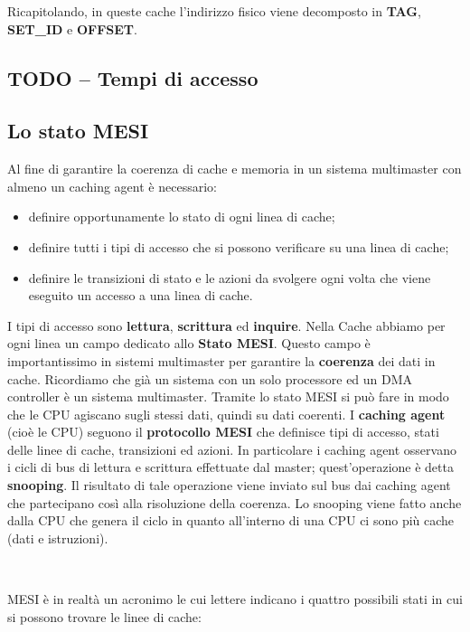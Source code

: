 \documentclass[11pt]{book}
\begin{document}
Ricapitolando, in queste cache l'indirizzo fisico viene decomposto in
\textbf{TAG}, \textbf{SET\_ID} e \textbf{OFFSET}.

\subsection{TODO -- Tempi di accesso}

\subsection{Lo stato MESI}

Al fine di garantire la coerenza di cache e memoria in un sistema
multimaster con almeno un caching agent \`e necessario:

\begin{itemize}
\item definire opportunamente lo stato di ogni linea di cache;
\item definire tutti i tipi di accesso che si possono verificare su
  una linea di cache;
\item definire le transizioni di stato e le azioni da svolgere ogni
  volta che viene eseguito un accesso a una linea di cache.
\end{itemize}

I tipi di accesso sono \textbf{lettura}, \textbf{scrittura} ed
\textbf{inquire}. Nella Cache abbiamo per ogni linea un campo dedicato
allo \textbf{Stato MESI}. Questo campo \`e importantissimo in sistemi
multimaster per garantire la \textbf{coerenza} dei dati in
cache. Ricordiamo che gi\`a un sistema con un solo processore ed un
DMA controller \`e un sistema multimaster. Tramite lo stato MESI si
pu\`o fare in modo che le CPU agiscano sugli stessi dati, quindi su
dati coerenti. I \textbf{caching agent} (cio\`e le CPU) seguono il
\textbf{protocollo MESI} che definisce tipi di accesso, stati delle
linee di cache, transizioni ed azioni. In particolare i caching agent
osservano i cicli di bus di lettura e scrittura effettuate dal master;
quest'operazione \`e detta \textbf{snooping}. Il risultato di tale
operazione viene inviato sul bus dai caching agent che partecipano
cos\`i alla risoluzione della coerenza. Lo snooping viene fatto anche
dalla CPU che genera il ciclo in quanto all'interno di una CPU ci sono
pi\`u cache (dati e istruzioni).

\

MESI \`e in realt\`a un acronimo le cui lettere indicano i quattro
possibili stati in cui si possono trovare le linee di cache:
\end{document}

